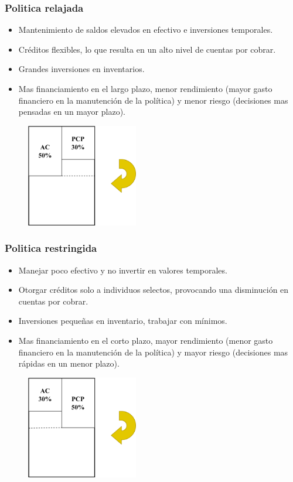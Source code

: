 \documentclass{templateNote}
\begin{document}
\subsubsection{Politica relajada}
\begin{itemize}
    \item Mantenimiento de saldos elevados en efectivo e inversiones temporales.
    \item Créditos flexibles, lo que resulta en un alto nivel de cuentas por cobrar.
    \item Grandes inversiones en inventarios.
    \item Mas financiamiento en el largo plazo, menor rendimiento (mayor gasto financiero en la manutención de la política) y menor riesgo (decisiones mas pensadas en un mayor plazo). 
\end{itemize}

\begin{figure}[H]
    \centering
    \includegraphics[height=4.5cm]{img/polirelajada.png}
\end{figure}

\subsubsection{Politica restringida}
\begin{itemize}
    \item Manejar poco efectivo y no invertir en valores temporales.
    \item Otorgar créditos solo a individuos selectos, provocando una disminución en cuentas por cobrar.
    \item Inversiones pequeñas en inventario, trabajar con mínimos.
    \item Mas financiamiento en el corto plazo, mayor rendimiento (menor gasto financiero en la manutención de la política) y mayor riesgo (decisiones mas rápidas en un menor plazo).
\end{itemize}
\begin{figure}[H]
    \centering
    \includegraphics[height=4.5cm]{img/polirestrict.png}
\end{figure}
\newpage
\end{document}
